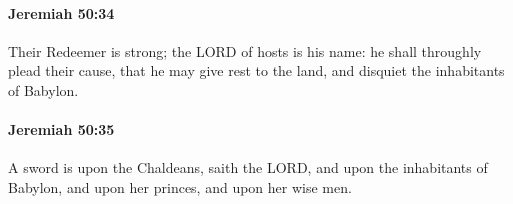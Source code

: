 		\paragraph{Jeremiah 50:34} %
			\label{JEREMIAH-50-34}

			Their Redeemer is strong; the LORD of hosts is his name: he shall throughly plead their cause, that he may give rest to the land, and disquiet the inhabitants of Babylon.


		\paragraph{Jeremiah 50:35} %
			\label{JEREMIAH-50-35}

			A sword is upon the Chaldeans, saith the LORD, and upon the inhabitants of Babylon, and upon her princes, and upon her wise men.


